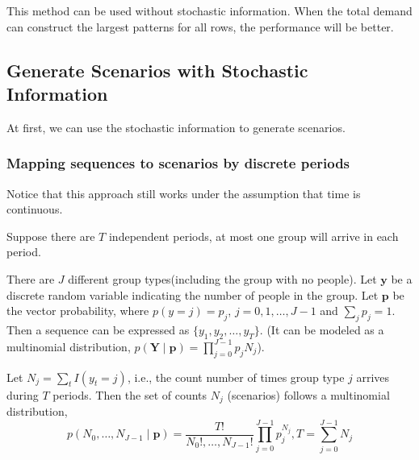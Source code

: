 This method can be used without stochastic information. When the total demand can construct the largest patterns for all rows, the performance will be better.


\subsection{Generate Scenarios with Stochastic Information}\label{MappingSeq}

At first, we can use the stochastic information to generate scenarios.




\subsubsection{Mapping sequences to scenarios by discrete periods}

Notice that this approach still works under the assumption that time is continuous.

Suppose there are $T$ independent periods, at most one group will arrive in each period.

There are $J$ different group types(including the group with no people). Let $\mathbf{y}$ be a discrete random variable indicating the number of people in the group. Let $\mathbf{p}$ be the vector probability, where $p(y = j) = p_j$, $j = 0,1,\ldots,J-1$ and $\sum_{j} p_{j} =1$. Then a sequence can be expressed as $\{y_{1}, y_{2}, \ldots, y_{T}\}$. (It can be modeled as a multinomial distribution, $p(\mathbf{Y} \mid \mathbf{p})=\prod_{j=0}^{J-1} p_j N_j$).

Let $N_{j} = \sum_{t} I(y_t = j)$, i.e., the count number of times group type $j$ arrives during $T$ periods. Then the set of counts $N_{j}$ (scenarios) follows a multinomial distribution, $$p\left(N_0, \ldots, N_{J-1} \mid \mathbf{p}\right)=\frac{T !}{N_{0}!, \ldots, N_{J-1}!} \prod_{j=0}^{J-1} p_{j}^{N_j}, T = \sum_{j=0}^{J-1} N_{j}$$



